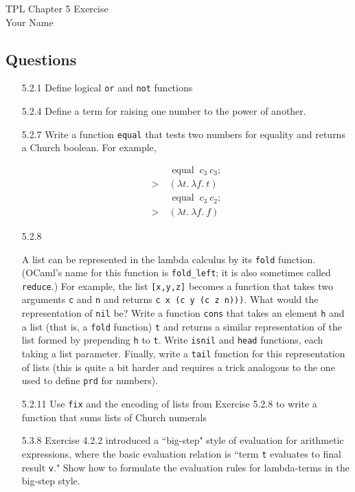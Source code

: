 \documentclass[12pt]{article}
\begin{document}
TPL \hfill Chapter 5 Exercise\\
Your Name

\hrulefill

\subsection*{Questions}

\begin{enumerate}

\item[5.2.1] Define logical \texttt{or} and \texttt{not} functions

\item[5.2.4] Define a term for raising one number to the
power of another.

\item[5.2.7] Write a function \texttt{equal} that tests two numbers for equality and returns a Church boolean. For example,

\begin{align*}
& \text { equal } \ c_3 \ c_3 ; \\
>\ & (\lambda t . \ \lambda f . \ t) \\
& \text { equal } \ c_3 \ c_2 ; \\
>\ & (\lambda t . \ \lambda f . \ f)
\end{align*}

\item[5.2.8]

A list can be represented in the lambda calculus by its \texttt{fold} function. (OCaml's name for this function is \texttt{fold\_left}; it is also sometimes called \texttt{reduce}.) For example, the list \texttt{[x,y,z]} becomes a function that takes two arguments \texttt{c} and \texttt{n} and returns \texttt{c x (c y (c z n)))}. What would the representation of \texttt{nil} be? Write a function \texttt{cons} that takes an element \texttt{h} and a list (that is, a \texttt{fold} function) \texttt{t} and returns a similar representation of the list formed by prepending \texttt{h} to \texttt{t}. Write \texttt{isnil} and \texttt{head} functions, each taking a list parameter. Finally, write a \texttt{tail} function for this representation of lists (this is quite a bit harder and requires a trick analogous to the one used to define \texttt{prd} for numbers).

\item[5.2.11] Use \texttt{fix} and the encoding of lists from Exercise 5.2.8 to write a function that sums lists of Church numerals

\item[5.3.8] Exercise 4.2.2 introduced a ``big-step" style of evaluation for
arithmetic expressions, where the basic evaluation relation is ``term \texttt{t} evaluates to final result \texttt{v}." Show how to formulate the evaluation rules for lambda-terms in the big-step style.

\end{enumerate}
\end{document}
